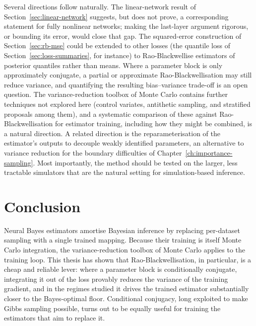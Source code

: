 Several directions follow naturally. The linear-network result of
Section~\ref{sec:linear-network} suggests, but does not prove, a
corresponding statement for fully nonlinear networks; making the
last-layer argument rigorous, or bounding its error, would close that
gap. The squared-error construction of Section~\ref{sec:rb-mse} could
be extended to other losses (the quantile loss of
Section~\ref{sec:loss-summaries}, for instance) to Rao-Blackwellise
estimators of posterior quantiles rather than means. Where a parameter
block is only approximately conjugate, a partial or approximate
Rao-Blackwellisation may still reduce variance, and quantifying the
resulting bias--variance trade-off is an open question. The
variance-reduction toolbox of Monte Carlo contains further techniques
not explored here (control variates, antithetic sampling, and
stratified proposals among them), and a systematic comparison of
these against Rao-Blackwellisation for estimator training, including
how they might be combined, is a natural direction. A related
direction is the reparameterisation of the estimator's outputs to
decouple weakly identified parameters, an alternative to variance
reduction for the boundary difficulties of
Chapter~\ref{ch:importance-sampling}. Most importantly, the method
should be tested on the larger, less tractable simulators that are the
natural setting for simulation-based inference.

\section{Conclusion}
\label{sec:final}

Neural Bayes estimators amortise Bayesian inference by replacing
per-dataset sampling with a single trained mapping. Because their
training is itself Monte Carlo integration, the variance-reduction
toolbox of Monte Carlo applies to the training loop. This thesis has
shown that Rao-Blackwellisation, in particular, is a cheap and
reliable lever: where a parameter block is conditionally conjugate,
integrating it out of the loss provably reduces the variance of the
training gradient, and in the regimes studied it drives the trained
estimator substantially closer to the Bayes-optimal floor. Conditional
conjugacy, long exploited to make Gibbs sampling possible, turns out
to be equally useful for training the estimators that aim to replace
it.
